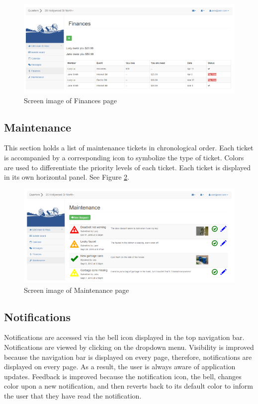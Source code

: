 \documentclass[12pt]{article}
\begin{document}
\begin{figure}
\centering
\includegraphics[width=\textwidth]{finances}
\caption{Screen image of Finances page}
\label{fig:finances}
\end{figure}

\subsection{Maintenance}
This section holds a list of maintenance tickets in chronological order. Each ticket is accompanied by a corresponding icon to symbolize the type of ticket. Colors are used to differentiate the priority levels of each ticket. Each ticket is displayed in its own horizontal panel. See Figure \ref{fig:maintenance}.

\begin{figure}
\centering
\includegraphics[width=\textwidth]{maintenance}
\caption{Screen image of Maintenance page}
\label{fig:maintenance}
\end{figure}

\subsection{Notifications}
Notifications are accessed via the bell icon displayed in the top navigation bar. Notifications are viewed by clicking on the dropdown menu. Visibility is improved because the navigation bar is displayed on every page, therefore, notifications are displayed on every page. As a result, the user is always aware of application updates. Feedback is improved because the notification icon, the bell, changes color upon a new notification, and then reverts back to its default color to inform the user that they have read the notification.
\end{document}

